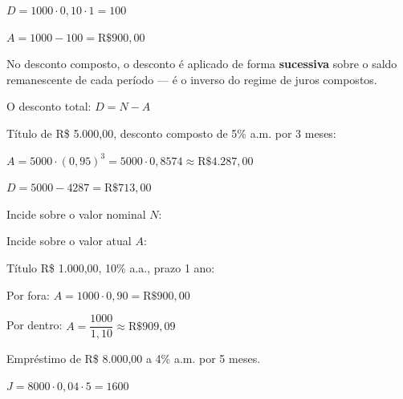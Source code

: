 \documentclass[12pt]{article}
\begin{document}
\begin{multicols}{2}
$D = 1000 \cdot 0{,}10 \cdot 1 = 100$

$A = 1000 - 100 = \text{R\$ } 900{,}00$


No desconto composto, o desconto é aplicado de forma \textbf{sucessiva} sobre o
saldo remanescente de cada período — é o inverso do regime de juros compostos.


O desconto total: $D = N - A$


Título de R\$ 5.000,00, desconto composto de 5\% a.m. por 3 meses:

$A = 5000 \cdot (0{,}95)^3 = 5000 \cdot 0{,}8574 \approx \text{R\$ } 4.287{,}00$

$D = 5000 - 4287 = \text{R\$ } 713{,}00$



Incide sobre o valor nominal $N$:



Incide sobre o valor atual $A$:



Título R\$ 1.000,00, 10\% a.a., prazo 1 ano:

Por fora: $A = 1000 \cdot 0{,}90 = \text{R\$ } 900{,}00$

Por dentro: $A = \dfrac{1000}{1{,}10} \approx \text{R\$ } 909{,}09$




Empréstimo de R\$ 8.000,00 a 4\% a.m. por 5 meses.

$J = 8000 \cdot 0{,}04 \cdot 5 = 1600$


\end{multicols}
\end{document}
